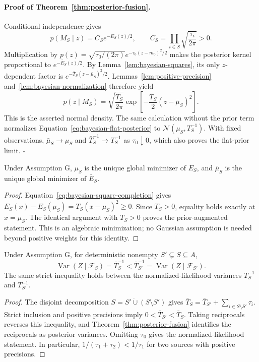 \paragraph{Proof of Theorem~\ref{thm:posterior-fusion}.}
Conditional independence gives
\begin{equation}
p(M_S\mid z)=C_S e^{-E_S(z)/2},\qquad
C_S=\prod_{i\in S}\sqrt{\frac{\tau_i}{2\pi}}>0.
\end{equation}
Multiplication by $p(z)=\sqrt{\tau_0/(2\pi)}e^{-\tau_0(z-m_0)^2/2}$ makes the posterior kernel proportional to $e^{-\bar E_S(z)/2}$. By Lemma~\ref{lem:bayesian-squares}, its only $z$-dependent factor is $e^{-\bar T_S(z-\bar\mu_S)^2/2}$. Lemmas~\ref{lem:positive-precision} and~\ref{lem:bayesian-normalization} therefore yield
\begin{equation}\label{eq:bayesian-posterior-density}
p(z\mid M_S)=\sqrt{\frac{\bar T_S}{2\pi}}\exp\!\left[-\frac{\bar T_S}{2}(z-\bar\mu_S)^2\right].
\end{equation}
This is the asserted normal density. The same calculation without the prior term normalizes Equation~\eqref{eq:bayesian-flat-posterior} to $\mathcal{N}(\mu_S,T_S^{-1})$. With fixed observations, $\bar\mu_S\to\mu_S$ and $\bar T_S^{-1}\to T_S^{-1}$ as $\tau_0\downarrow0$, which also proves the flat-prior limit. \hfill$\square$

\begin{mosaictheorem}\label{thm:fusion-optimality}
Under Assumption G, $\mu_S$ is the unique global minimizer of $E_S$, and $\bar\mu_S$ is the unique global minimizer of $\bar E_S$.
\end{mosaictheorem}
\begin{proof}
Equation~\eqref{eq:bayesian-square-completion} gives $E_S(x)-E_S(\mu_S)=T_S(x-\mu_S)^2\geq0$. Since $T_S>0$, equality holds exactly at $x=\mu_S$. The identical argument with $\bar T_S>0$ proves the prior-augmented statement. This is an algebraic minimization; no Gaussian assumption is needed beyond positive weights for this identity.
\end{proof}

\begin{mosaictheorem}\label{thm:retained-route}
Under Assumption G, for deterministic nonempty $S'\subsetneq S\subseteq A$,
\begin{equation}
\operatorname{Var}(Z\mid\mathcal{F}_S)=\bar T_S^{-1}<\bar T_{S'}^{-1}=\operatorname{Var}(Z\mid\mathcal{F}_{S'}).
\end{equation}
The same strict inequality holds between the normalized-likelihood variances $T_S^{-1}$ and $T_{S'}^{-1}$.
\end{mosaictheorem}
\begin{proof}
The disjoint decomposition $S=S'\mathbin{\dot\cup}(S\setminus S')$ gives $\bar T_S=\bar T_{S'}+\sum_{i\in S\setminus S'}\tau_i$. Strict inclusion and positive precisions imply $0<\bar T_{S'}<\bar T_S$. Taking reciprocals reverses this inequality, and Theorem~\ref{thm:posterior-fusion} identifies the reciprocals as posterior variances. Omitting $\tau_0$ gives the normalized-likelihood statement. In particular, $1/(\tau_1+\tau_2)<1/\tau_1$ for two sources with positive precisions.
\end{proof}

